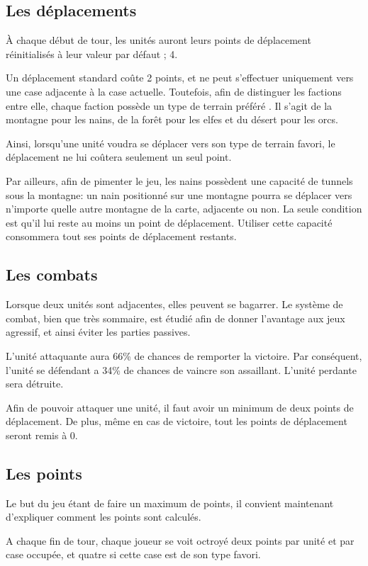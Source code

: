 	\subsection{Les déplacements}
		\`A chaque début de tour, les unités auront leurs points de déplacement réinitialisés à leur valeur par défaut ; 4.

		Un déplacement standard coûte 2 points, et ne peut s'effectuer uniquement vers une case adjacente à la case actuelle. Toutefois, afin de distinguer les factions entre elle, chaque faction possède un type de terrain \og préféré \fg. Il s'agit de la montagne pour les nains, de la forêt pour les elfes et du désert pour les orcs.

		Ainsi, lorsqu'une unité voudra se déplacer vers son type de terrain favori, le déplacement ne lui coûtera seulement un seul point.

		Par ailleurs, afin de pimenter le jeu, les nains possèdent une capacité de tunnels sous la montagne: un nain positionné sur une montagne pourra se déplacer vers n'importe quelle autre montagne de la carte, adjacente ou non. La seule condition est qu'il lui reste au moins un point de déplacement. Utiliser cette capacité consommera tout ses points de déplacement restants.

	\subsection{Les combats}
		Lorsque deux unités sont adjacentes, elles peuvent se bagarrer. Le système de combat, bien que très sommaire, est étudié afin de donner l'avantage aux jeux agressif, et ainsi éviter les parties passives.

		L'unité attaquante aura 66\% de chances de remporter la victoire. Par conséquent, l'unité se défendant a 34\% de chances de vaincre son assaillant. L'unité perdante sera détruite.

		Afin de pouvoir attaquer une unité, il faut avoir un minimum de deux points de déplacement. De plus, même en cas de victoire, tout les points de déplacement seront remis à 0.

	\subsection{Les points}
		Le but du jeu étant de faire un maximum de points, il convient maintenant d'expliquer comment les points sont calculés.

		A chaque fin de tour, chaque joueur se voit octroyé deux points par unité et par case occupée, et quatre si cette case est de son type favori.

